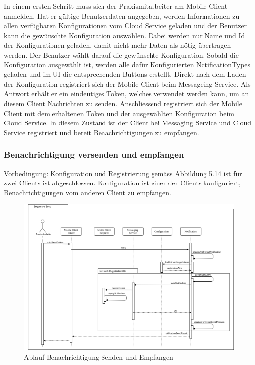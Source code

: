 In einem ersten Schritt muss sich der Praxismitarbeiter am Mobile Client anmelden.
Hat er gültige Benutzerdaten angegeben, werden Informationen zu allen verfügbaren Konfigurationen vom Cloud Service geladen und der Benutzer kann die gewünschte Konfiguration auswählen.
Dabei werden nur Name und Id der Konfigurationen geladen, damit nicht mehr Daten als nötig übertragen werden.
Der Benutzer wählt darauf die gewünschte Konfiguration.
Sobald die Konfiguration ausgewählt ist, werden alle dafür Konfigurierten NotificationTypes geladen und im UI die entsprechenden Buttons erstellt.
Direkt nach dem Laden der Konfiguration registriert sich der Mobile Client beim Messageing Service.
Als Antwort erhält er ein eindeutiges Token, welches verwendet werden kann, um an diesem Client Nachrichten zu senden.
Anschliessend registriert sich der Mobile Client mit dem erhaltenen Token und der ausgewählten Konfiguration beim Cloud Service.
In diesem Zustand ist der Client bei Messaging Service und Cloud Service registriert und bereit Benachrichtigungen zu empfangen.

\clearpage

\subsubsection*{Benachrichtigung versenden und empfangen}

Vorbedingung:
Konfiguration und Registrierung gemäss Abbildung 5.14 ist für zwei Clients ist abgeschlossen.
Konfiguration ist einer der Clients konfiguriert, Benachrichtigungen vom anderen Client zu empfangen.

\begin{figure}[h]
    \centering
    \begin{minipage}[b]{0.9\textwidth}
        \includegraphics[width=\textwidth]{graphics/Sequence_Notification_Send}
        \caption{Ablauf Benachrichtigung Senden und Empfangen}
    \end{minipage}
\end{figure}

